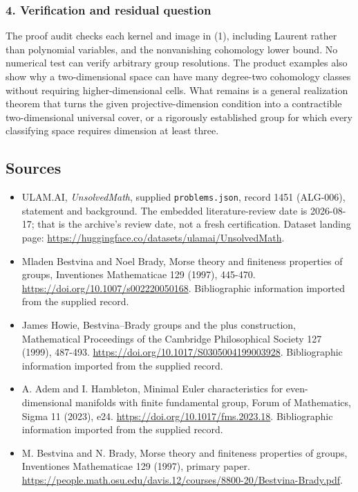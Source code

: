 \documentclass[11pt,a4paper]{article}
\begin{document}
\subsubsection{4. Verification and residual question}
The proof audit checks each kernel and image in (1), including Laurent rather than polynomial variables, and the nonvanishing cohomology lower bound. No numerical test can verify arbitrary group resolutions. The product examples also show why a two-dimensional space can have many degree-two cohomology classes without requiring higher-dimensional cells. What remains is a general realization theorem that turns the given projective-dimension condition into a contractible two-dimensional universal cover, or a rigorously established group for which every classifying space requires dimension at least three.

\subsection{Sources}

{\small

\begin{itemize}

\item[\hypertarget{source:1451:1}{S1}] ULAM.AI, \emph{UnsolvedMath}, supplied \texttt{problems.json}, record 1451 (ALG-006), statement and background. The embedded literature-review date is 2026-08-17; that is the archive’s review date, not a fresh certification. Dataset landing page: \url{https://huggingface.co/datasets/ulamai/UnsolvedMath}.

\item[\hypertarget{source:1451:2}{S2}] Mladen Bestvina and Noel Brady, Morse theory and finiteness properties of groups, Inventiones Mathematicae 129 (1997), 445-470. \url{https://doi.org/10.1007/s002220050168}. Bibliographic information imported from the supplied record.

\item[\hypertarget{source:1451:3}{S3}] James Howie, Bestvina--Brady groups and the plus construction, Mathematical Proceedings of the Cambridge Philosophical Society 127 (1999), 487-493. \url{https://doi.org/10.1017/S0305004199003928}. Bibliographic information imported from the supplied record.

\item[\hypertarget{source:1451:4}{S4}] A. Adem and I. Hambleton, Minimal Euler characteristics for even-dimensional manifolds with finite fundamental group, Forum of Mathematics, Sigma 11 (2023), e24. \url{https://doi.org/10.1017/fms.2023.18}. Bibliographic information imported from the supplied record.

\item[R1] M. Bestvina and N. Brady, Morse theory and finiteness properties of groups, Inventiones Mathematicae 129 (1997), primary paper.
\url{https://people.math.osu.edu/davis.12/courses/8800-20/Bestvina-Brady.pdf}.
\end{itemize}

}

\label{end:1451}
\end{document}
